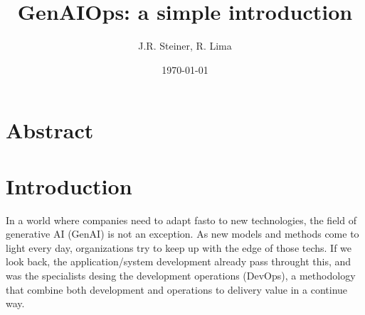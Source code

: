\documentclass{revtex4}
\begin{document}
\title{GenAIOps: a simple introduction}
\author{J.R. Steiner, R. Lima}
\date{\today}


\maketitle
\tableofcontents
\newpage

\section*{Abstract}





\section{Introduction}

In a world where companies need to adapt fasto to new technologies, the field of generative AI (GenAI) is not an exception. As new models and methods come to light every day, organizations try to keep up with the edge of those techs. If we look back, the application/system development already pass throught this, and was the specialists desing the development operations (DevOps), a methodology that combine both development and operations to delivery value in a continue way.
\end{document}
